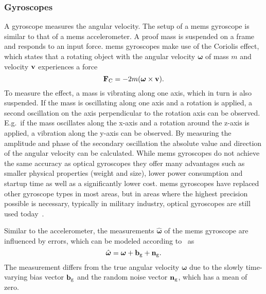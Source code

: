 \subsubsection{ Gyroscopes}
A gyroscope measures the angular velocity.
The setup of a \gls{mems} gyroscope is similar to that of a \gls{mems} accelerometer.
A proof mass is suspended on a frame and responds to an input force.
\gls{mems} gyroscopes make use of the Coriolis effect, which states that a rotating object with the angular velocity $\boldsymbol{\omega}$ of mass $m$ and velocity $\vb{v}$ experiences a force
\begin{equation}
    \vb{F}_\mathrm{C}  = -2m(\boldsymbol{\omega}\times \vb{v}).
\end{equation}
To measure the effect, a mass is vibrating along one axis, which in turn is also suspended.
If the mass is oscillating along one axis and a rotation is applied, a second oscillation on the axis perpendicular to the rotation axis can be observed.
E.g.\ if the mass oscillates along the x-axis and a rotation around the z-axis is applied, a vibration along the y-axis can be observed.
By measuring the amplitude and phase of the secondary oscillation the absolute value and direction of the angular velocity can be calculated.
While \gls{mems} gyroscopes do not achieve the same accuracy as optical gyroscopes they offer many advantages such as smaller physical properties (weight and size), lower power consumption and startup time as well as a significantly lower cost.
\gls{mems} gyroscopes have replaced other gyroscope types in most areas, but in areas where the highest precision possible is necessary, typically in military industry, optical gyroscopes are still used today~\cite{Perlmutter2016}.\par
Similar to the accelerometer, the measurements $\hat{\boldsymbol{\omega}}$ of the \gls{mems} gyroscope are influenced by errors, which can be modeled according to~\cite{Lefferts1982} as
\begin{equation}
    \hat{\boldsymbol{\omega}} = \boldsymbol{\omega} + \vb{b}_\mathrm{g} + \vb{n}_\mathrm{g}.
\end{equation}
The measurement differs from the true angular velocity $\boldsymbol{\omega}$ due to the slowly time-varying bias vector $\vb{b}_\mathrm{g}$ and the random noise vector $\vb{n}_\mathrm{g}$, which has a mean of zero.

